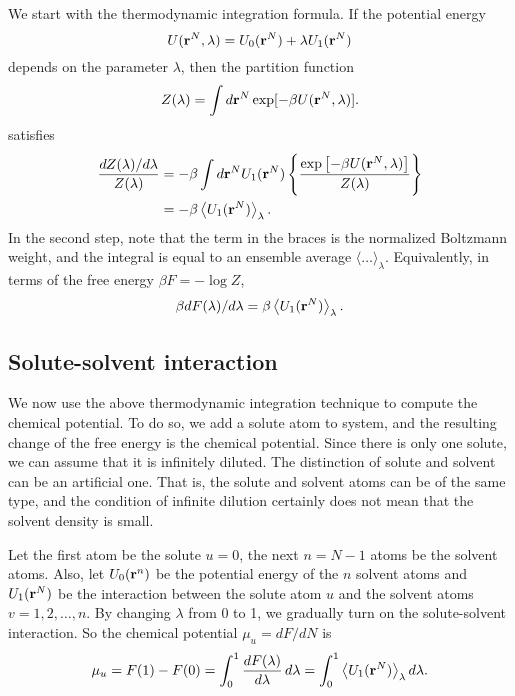 \documentclass[12pt]{article}
\begin{document}
We start with the thermodynamic integration formula.
If the potential energy
\begin{equation}
  U(\mathbf{r}^N, \lambda) = U_0(\mathbf{r}^N) + \lambda U_1(\mathbf{r}^N)
  \label{eq:potene}
\end{equation}
depends on the parameter $\lambda$,
then the partition function
%
\begin{equation}
  Z(\lambda) = \int d\mathbf{r}^N \exp[-\beta U(\mathbf{r}^N, \lambda)].
  \label{eq:partfunc}
\end{equation}
%
satisfies
\begin{align}
  \frac{ d Z(\lambda) / d\lambda }{Z(\lambda)}
  &=
    -\beta \int d\mathbf{r}^N U_1(\mathbf{r}^N)
    \left\{
      \frac{ \exp
             \left[
             -\beta U(\mathbf{r}^N, \lambda)
             \right]}
      { Z(\lambda) }
    \right\} \notag \\
  &=
    -\beta
    \left\langle
      U_1(\mathbf{r}^N)
    \right\rangle_\lambda.
\end{align}
In the second step, note that the term in the braces
  is the normalized Boltzmann weight,
  and the integral is equal to an ensemble average
  $\langle \dots \rangle_\lambda$.
%
Equivalently, in terms of the free energy $\beta F = -\log Z$,
\begin{equation}
  \beta d F(\lambda) / d\lambda
  = \beta
    \left\langle
      U_1(\mathbf{r}^N)
    \right\rangle_\lambda.
\end{equation}



\subsection{Solute-solvent interaction}

We now use the above thermodynamic integration technique
  to compute the chemical potential.
To do so, we add a solute atom to system,
  and the resulting change of the free energy
  is the chemical potential.
Since there is only one solute,
  we can assume that it is infinitely diluted.
The distinction of solute and solvent
  can be an artificial one.
That is, the solute and solvent atoms can be of the same type,
  and the condition of infinite dilution certainly does not mean
  that the solvent density is small.

Let the first atom be the solute $u = 0$,
  the next $n = N - 1$ atoms be the solvent atoms.
Also,
  let $U_0(\mathbf{r}^n)$ be the potential energy of the $n$ solvent atoms
  and $U_1(\mathbf{r}^N)$ be the interaction between the solute atom $u$
  and the solvent atoms $v = 1, 2, \dots, n$.
By changing $\lambda$ from 0 to 1, we gradually turn on
  the solute-solvent interaction.
%
So the chemical potential $\mu_u = dF/dN$ is
\begin{align}
  \mu_u
  =
  F(1) - F(0)
  =
  \int_0^1 \frac{d F(\lambda)}{d \lambda} \, d\lambda
  =
  \int_0^1
    \left\langle
      U_1(\mathbf{r}^N)
    \right\rangle_\lambda d\lambda.
  \label{eq:mu_ti0}
\end{align}
\end{document}
